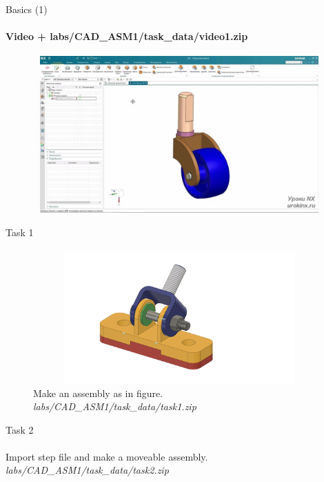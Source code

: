 \documentclass[aspectratio=169]{beamer}
\begin{document}
\begin{frame}[t]{Basics (1)}
    \framesubtitle{Video + labs/CAD\_ASM1/task\_data/video1.zip}
    \vspace{-0.6cm}
    \begin{figure}[H]
        \href{https://disk.yandex.ru/i/eTpcseXL44F6jQ}{
            \centering\includegraphics[height=6cm,width=1\textwidth,keepaspectratio]{1.png}}
        \label{fig:1}
    \end{figure}
\end{frame}

\begin{frame}[t]{Task 1}
\framesubtitle{}
    \begin{figure}[H]
        \centering\includegraphics[height=5cm,width=1\textwidth,keepaspectratio]{task1.png}
        \caption*{Make an assembly as in figure. \textit{labs/CAD\_ASM1/task\_data/task1.zip}}
        \label{fig:task1.png}
    \end{figure}
\end{frame}

\begin{frame}[t]{Task 2}
    \framesubtitle{}
        Import step file and make a moveable assembly.\textit{ labs/CAD\_ASM1/task\_data/task2.zip}
    \end{frame}
\end{document}
